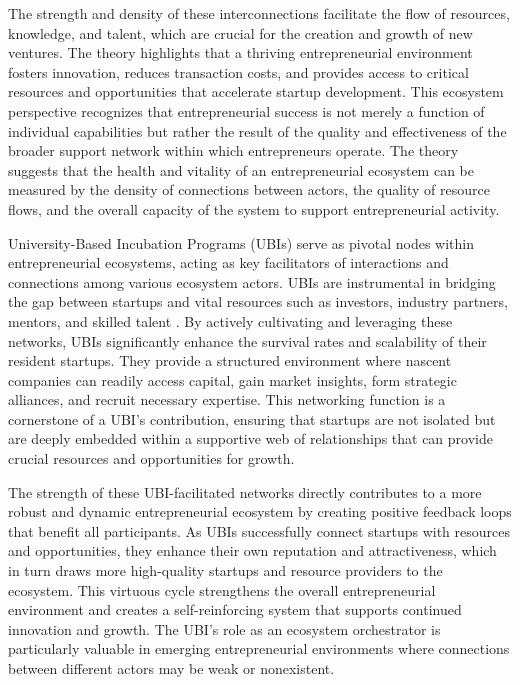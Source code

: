 \documentclass[../Main.tex]{subfiles}
\begin{document}
The strength and density of these interconnections facilitate the flow of resources, knowledge, and talent, which are crucial for the creation and growth of new ventures. The theory highlights that a thriving entrepreneurial environment fosters innovation, reduces transaction costs, and provides access to critical resources and opportunities that accelerate startup development. This ecosystem perspective recognizes that entrepreneurial success is not merely a function of individual capabilities but rather the result of the quality and effectiveness of the broader support network within which entrepreneurs operate. The theory suggests that the health and vitality of an entrepreneurial ecosystem can be measured by the density of connections between actors, the quality of resource flows, and the overall capacity of the system to support entrepreneurial activity.

University-Based Incubation Programs (UBIs) serve as pivotal nodes within entrepreneurial ecosystems, acting as key facilitators of interactions and connections among various ecosystem actors. UBIs are instrumental in bridging the gap between startups and vital resources such as investors, industry partners, mentors, and skilled talent \cite{theodorakopoulos2014business}. By actively cultivating and leveraging these networks, UBIs significantly enhance the survival rates and scalability of their resident startups. They provide a structured environment where nascent companies can readily access capital, gain market insights, form strategic alliances, and recruit necessary expertise. This networking function is a cornerstone of a UBI's contribution, ensuring that startups are not isolated but are deeply embedded within a supportive web of relationships that can provide crucial resources and opportunities for growth.

The strength of these UBI-facilitated networks directly contributes to a more robust and dynamic entrepreneurial ecosystem by creating positive feedback loops that benefit all participants. As UBIs successfully connect startups with resources and opportunities, they enhance their own reputation and attractiveness, which in turn draws more high-quality startups and resource providers to the ecosystem. This virtuous cycle strengthens the overall entrepreneurial environment and creates a self-reinforcing system that supports continued innovation and growth. The UBI's role as an ecosystem orchestrator is particularly valuable in emerging entrepreneurial environments where connections between different actors may be weak or nonexistent.
\end{document}
